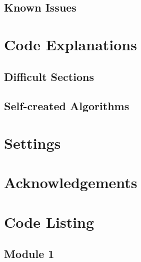 \subsection{Known Issues}

\section{Code Explanations}

\subsection{Difficult Sections}

\subsection{Self-created Algorithms}

\section{Settings}

\section{Acknowledgements}

\section{Code Listing}
\begin{landscape}
\subsection{Module 1}
\begin{comment}
\pythonfile[firstline=5]{./tex/function_programs/print_function.py}
\end{comment}
\end{landscape}

